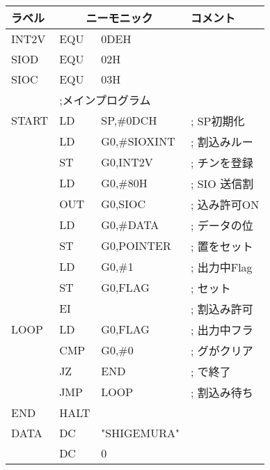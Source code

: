 \begin{center}
{\footnotesize\tt
\begin{tabular}{|l|l l l|} \hline
ラベル & \multicolumn{2}{|c}{ニーモニック} & コメント  \\
\hline
INT2V   & EQU   & 0DEH               &                   \\
SIOD    & EQU   & 02H                &                   \\
SIOC    & EQU   & 03H                &                   \\
        & \multicolumn{3}{|l|}{;メインプログラム}        \\
START   & LD    & SP,\#0DCH          & ; SP初期化        \\
        & LD    & G0,\#SIOXINT       & ; 割込みルー      \\
        & ST    & G0,INT2V           & ; チンを登録      \\
        & LD    & G0,\#80H           & ; SIO 送信割      \\
        & OUT   & G0,SIOC            & ; 込み許可ON      \\
        & LD    & G0,\#DATA          & ; データの位      \\
        & ST    & G0,POINTER         & ; 置をセット      \\
        & LD    & G0,\#1             & ; 出力中Flag      \\
        & ST    & G0,FLAG            & ; セット          \\
        & EI    &                    & ; 割込み許可      \\
LOOP    & LD    & G0,FLAG            & ; 出力中フラ      \\
        & CMP   & G0,\#0             & ; グがクリア      \\
        & JZ    & END                & ; で終了          \\
        & JMP   & LOOP               & ; 割込み待ち      \\
END     & HALT  &                    &                   \\
DATA    & DC    & "SHIGEMURA"        &                   \\
        & DC    & 0                  &                   \\

\end{tabular}}
\end{center}
